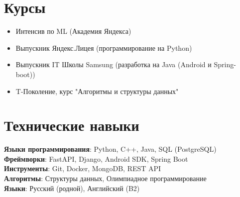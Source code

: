 \documentclass[letterpaper,11pt]{article}
\newcommand{\resumeItem}[1]{
  \item\small{
    {#1 \vspace{-2pt}}
  }
}
\newcommand{\resumeSubHeadingListStart}{\begin{itemize}[leftmargin=0.15in, label={}]}
\newcommand{\resumeSubHeadingListEnd}{\end{itemize}}
\begin{document}
\section{Курсы}
  \resumeSubHeadingListStart
    \resumeItem{Интенсив по ML (Академия Яндекса)}
    \resumeItem{Выпускник Яндекс.Лицея (программирование на Python)}
    \resumeItem{Выпускник IT Школы Samsung (разработка на Java (Android и Spring-boot))}
    \resumeItem{T-Поколение, курс "Алгоритмы и структуры данных"}
  \resumeSubHeadingListEnd

\section{Технические навыки}
 \begin{itemize}[leftmargin=0.15in, label={}]
    \small{\item{
     \textbf{Языки программирования}{: Python, C++, Java, SQL (PostgreSQL)} \\
     \textbf{Фреймворки}{: FastAPI, Django, Android SDK, Spring Boot} \\
     \textbf{Инструменты}{: Git, Docker, MongoDB, REST API} \\
     \textbf{Алгоритмы}{: Структуры данных, Олимпиадное программирование} \\
     \textbf{Языки}{: Русский (родной), Английский (B2)}
    }}
 \end{itemize}
\end{document}
